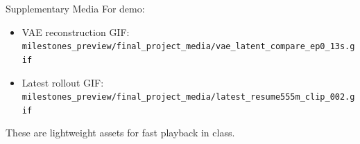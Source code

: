 \documentclass[aspectratio=169,11pt]{beamer}
\begin{document}
\begin{frame}{Supplementary Media}
For demo:
\begin{itemize}
  \item VAE reconstruction GIF:\\
  \texttt{milestones\_preview/final\_project\_media/vae\_latent\_compare\_ep0\_13s.gif}
  \item Latest rollout GIF:\\
  \texttt{milestones\_preview/final\_project\_media/latest\_resume555m\_clip\_002.gif}
\end{itemize}
\vspace{0.4em}
These are lightweight assets for fast playback in class.
\end{frame}
\end{document}
